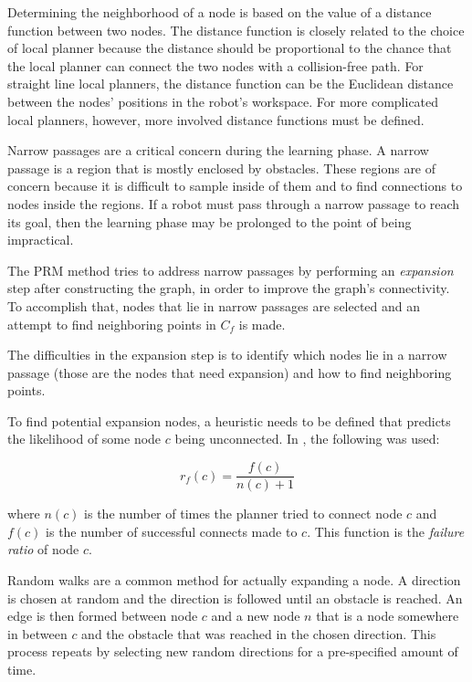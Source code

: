 \documentclass[10pt,conference]{ieeeconf}
\begin{document}
Determining the neighborhood of a node is based on the value of a distance function between two nodes. The distance function is closely related to the choice of local planner because the distance should be proportional to the chance that the local planner can connect the two nodes with a collision-free path. For straight line local planners, the distance function can be the Euclidean distance between the nodes' positions in the robot's workspace. For more complicated local planners, however, more involved distance functions must be defined.  

Narrow passages are a critical concern during the learning phase. A narrow passage is a region that is mostly enclosed by obstacles. These regions are of concern because it is difficult to sample inside of them and to find connections to nodes inside the regions. If a robot must pass through a narrow passage to reach its goal, then the learning phase may be prolonged to the point of being impractical. 

The PRM method tries to address narrow passages by performing an \emph{expansion} step after constructing the graph, in order to improve the graph's connectivity. To accomplish that, nodes that lie in narrow passages are selected and an attempt to find neighboring points in $C_f$ is made. 

The difficulties in the expansion step is to identify which nodes lie in a narrow passage (those are the nodes that need expansion) and how to find neighboring points.

To find potential expansion nodes, a heuristic needs to be defined that predicts the likelihood of some node $c$ being unconnected. In \cite{PRM}, the following was used:

\begin{equation}
r_f(c) = \frac{f(c)}{n(c)+1}
\end{equation}

where $n(c)$ is the number of times the planner tried to connect node $c$ and $f(c)$ is the number of successful connects made to $c$. This function is the \emph{failure ratio} of node $c$.  

Random walks are a common method for actually expanding a node. A direction is chosen at random and the direction is followed until an obstacle is reached. An edge is then formed between node $c$ and a new node $n$ that is a node somewhere in between $c$ and the obstacle that was reached in the chosen direction. This process repeats by selecting new random directions for a pre-specified amount of time.
\end{document}
